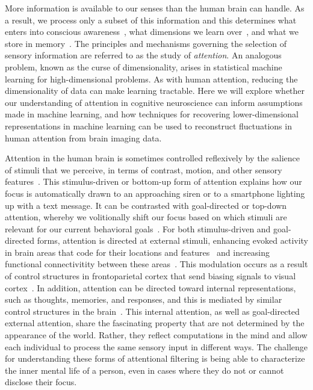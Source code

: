 
\label{sec:aim3}

More information is available to our senses than the human brain can
handle. As a result, we process only a subset of this information and
this determines what enters into conscious
awareness~\citep{Most:2005}, what dimensions we learn
over~\citep{Turk-Browne:2005}, and what we store in
memory~\citep{Aly:2016}. The principles and mechanisms governing the
selection of sensory information are referred to as the study of
\textit{attention}. An analogous problem, known as the curse of
dimensionality, arises in statistical machine learning for
high-dimensional problems. As with human attention, reducing the
dimensionality of data can make learning tractable. Here we will
explore whether our understanding of attention in cognitive
neuroscience can inform assumptions made in machine learning, and how
techniques for recovering lower-dimensional representations in machine
learning can be used to reconstruct fluctuations in human attention
from brain imaging data.

\biobackground{} Attention in the human brain is sometimes controlled
reflexively by the salience of stimuli that we perceive, in terms of
contrast, motion, and other sensory features~\citep{Itti:2000}. This
stimulus-driven or bottom-up form of attention explains how our focus
is automatically drawn to an approaching siren or to a smartphone
lighting up with a text message. It can be contrasted with
goal-directed or top-down attention, whereby we volitionally shift our
focus based on which stimuli are relevant for our current behavioral
goals~\citep{Yantis:2000}. For both stimulus-driven and goal-directed
forms, attention is directed at external stimuli, enhancing evoked
activity in brain areas that code for their locations and
features~\citep{Kastner:2000} and increasing functional connectivitity
between these areas~\citep{Turk-Browne:2013}. This modulation occurs
as a result of control structures in frontoparietal cortex that send
biasing signals to visual cortex~\citep{Noudoost:2010}. In addition,
attention can be directed toward internal representations, such as
thoughts, memories, and responses, and this is mediated by similar
control structures in the brain~\citep{Chun:2011}. This internal
attention, as well as goal-directed external attention, share the
fascinating property that are not determined by the appearance of the
world. Rather, they reflect computations in the mind and allow each
individual to process the same sensory input in different ways. The
challenge for understanding these forms of attentional filtering is
being able to characterize the inner mental life of a person, even in
cases where they do not or cannot disclose their focus.

